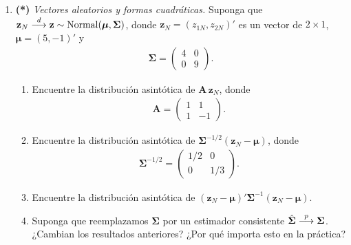 \documentclass[letterpaper,11pt]{article}
\begin{document}
\begin{enumerate}[itemsep=1.2em]
\item \textbf{(*)} \emph{Vectores aleatorios y formas cuadráticas.} Suponga que
    $\mathbf{z}_N \stackrel{d}{\longrightarrow} \mathbf{z}\sim \operatorname{Normal}(\boldsymbol{\mu},\boldsymbol{\Sigma})$, donde
    $\mathbf{z}_N=(z_{1N},z_{2N})'$ es un vector de $2\times 1$,
    $\boldsymbol{\mu}=(5,-1)'$ y
    \begin{align*}
    \boldsymbol{\Sigma}=\begin{pmatrix} 4 & 0 \\ 0 & 9 \end{pmatrix}.
    \end{align*}
    \begin{enumerate}
        \item Encuentre la distribución asintótica de $\mathbf{A}\,\mathbf{z}_N$, donde
              \begin{align*}
              \mathbf{A}=\begin{pmatrix} 1 & 1 \\ 1 & -1 \end{pmatrix}.
              \end{align*}
        \item Encuentre la distribución asintótica de
              $\boldsymbol{\Sigma}^{-1/2}(\mathbf{z}_N-\boldsymbol{\mu})$, donde
              \begin{align*}
              \boldsymbol{\Sigma}^{-1/2}=\begin{pmatrix} 1/2 & 0 \\ 0 & 1/3 \end{pmatrix}.
              \end{align*}
        \item Encuentre la distribución asintótica de
              $(\mathbf{z}_N-\boldsymbol{\mu})'\boldsymbol{\Sigma}^{-1}(\mathbf{z}_N-\boldsymbol{\mu})$.
        \item Suponga que reemplazamos $\boldsymbol{\Sigma}$ por un estimador consistente
              $\hat{\boldsymbol{\Sigma}}\stackrel{p}{\longrightarrow}\boldsymbol{\Sigma}$. ¿Cambian los resultados
              anteriores? ¿Por qué importa esto en la práctica?
    \end{enumerate}


\end{enumerate}
\end{document}

